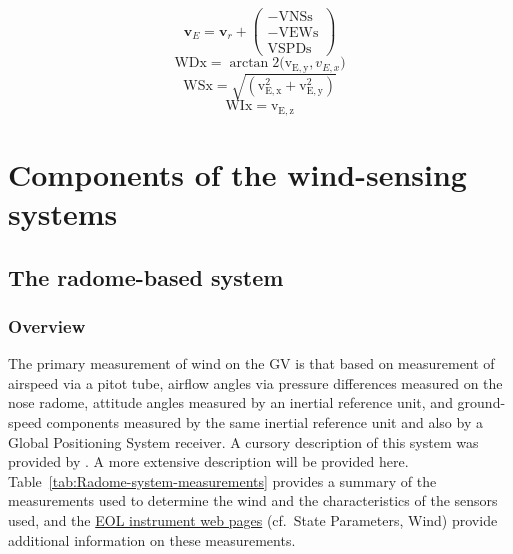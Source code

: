 \documentclass[12pt,twoside,english]{article}\usepackage[]{graphicx}\usepackage[]{color}
\let\stdsection\section
\renewcommand{\section}{\newpage\stdsection}
\let\OrgIndex\index
\renewcommand*{\index}[1]{\OrgIndex{#1}}
\begin{document}
{\begin{equation}
\mathbf{v}_{E}=\mathbf{v}_{r}+\left(\begin{array}{c}
-\mathrm{VNSs}\\ -\mathrm{VEWs}\\ 
\mathrm{VSPDs}
\end{array}\right)\label{eq:vg}
\end{equation}
\begin{equation}
\mathrm{WDx=\arctan2(v_{E,y},}v_{E,x})\label{eq:wd}
\end{equation}
\begin{equation}
\mathrm{WSx=\sqrt{(v_{E,x}^{2}+v_{E,y}^{2})}}\label{eq:ws}
\end{equation}
\begin{equation}
\mathrm{WIx=v_{E,z}}\label{eq:wi}
\end{equation}




\section{Components of the wind-sensing systems\label{sec:Components}}

\subsection{The radome-based system\label{sub:The-radome-based-system}}


\subsubsection{Overview}

The primary measurement of wind on the GV  is that based on measurement of airspeed via a pitot tube, airflow angles via pressure differences measured on the nose radome, attitude angles measured by an inertial reference unit, and ground-speed components measured by the same inertial reference unit and also by a Global Positioning System receiver. A cursory description of this system was provided by \citet{CooperEtAl2014}. A more extensive description will be provided here. Table~\ref{tab:Radome-system-measurements} provides a summary of the measurements used to determine the wind and the characteristics of the sensors used, and the \href{http://www.eol.ucar.edu/aircraft-instrumentation}{EOL instrument web pages} (cf.~\textquotedbl{}State Parameters\textquotedbl{}, \textquotedbl{}Wind\textquotedbl{}) provide additional information on these measurements.  

}
\end{document}
